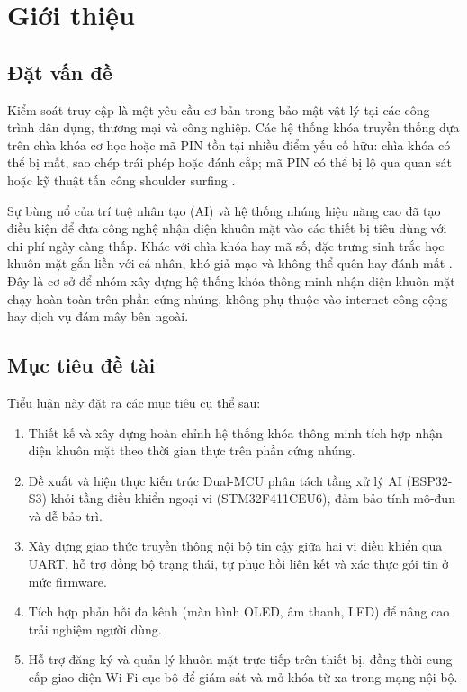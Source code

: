 \chapter{Giới thiệu}
\label{chap:intro}

\section{Đặt vấn đề}
\label{sec:problem}

Kiểm soát truy cập là một yêu cầu cơ bản trong bảo mật vật lý tại các công trình dân dụng, thương mại và công nghiệp. Các hệ thống khóa truyền thống dựa trên chìa khóa cơ học hoặc mã PIN tồn tại nhiều điểm yếu cố hữu: chìa khóa có thể bị mất, sao chép trái phép hoặc đánh cắp; mã PIN có thể bị lộ qua quan sát hoặc kỹ thuật tấn công shoulder surfing \cite{beautment2009}.

Sự bùng nổ của trí tuệ nhân tạo (AI) và hệ thống nhúng hiệu năng cao đã tạo điều kiện để đưa công nghệ nhận diện khuôn mặt vào các thiết bị tiêu dùng với chi phí ngày càng thấp. Khác với chìa khóa hay mã số, đặc trưng sinh trắc học khuôn mặt gắn liền với cá nhân, khó giả mạo và không thể quên hay đánh mất \cite{jain2004}. Đây là cơ sở để nhóm xây dựng hệ thống khóa thông minh nhận diện khuôn mặt chạy hoàn toàn trên phần cứng nhúng, không phụ thuộc vào internet công cộng hay dịch vụ đám mây bên ngoài.

\section{Mục tiêu đề tài}
\label{sec:objectives}

Tiểu luận này đặt ra các mục tiêu cụ thể sau:

\begin{enumerate}[label=\arabic*.]
  \item Thiết kế và xây dựng hoàn chỉnh hệ thống khóa thông minh tích hợp nhận diện khuôn mặt theo thời gian thực trên phần cứng nhúng.
  \item Đề xuất và hiện thực kiến trúc Dual-MCU phân tách tầng xử lý AI (ESP32-S3) khỏi tầng điều khiển ngoại vi (STM32F411CEU6), đảm bảo tính mô-đun và dễ bảo trì.
  \item Xây dựng giao thức truyền thông nội bộ tin cậy giữa hai vi điều khiển qua UART, hỗ trợ đồng bộ trạng thái, tự phục hồi liên kết và xác thực gói tin ở mức firmware.
  \item Tích hợp phản hồi đa kênh (màn hình OLED, âm thanh, LED) để nâng cao trải nghiệm người dùng.
  \item Hỗ trợ đăng ký và quản lý khuôn mặt trực tiếp trên thiết bị, đồng thời cung cấp giao diện Wi-Fi cục bộ để giám sát và mở khóa từ xa trong mạng nội bộ.
\end{enumerate}

